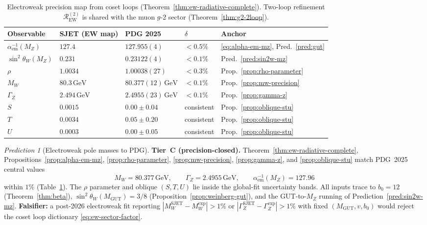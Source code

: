 \documentclass[11pt]{article}
\theoremstyle{plain}
\theoremstyle{definition}
\theoremstyle{remark}
\newtheorem{prediction}[theorem]{Prediction}
\numberwithin{equation}{section}
\begin{document}
\begin{table}[ht]
\centering
\small
\renewcommand{\arraystretch}{1.14}
\begin{tabular}{@{}lllll@{}}
\toprule
\textbf{Observable} & \textbf{SJET (EW map)} & \textbf{PDG 2025} &
$\delta$ & \textbf{Anchor} \\
\midrule
$\alpha_{\mathrm{em}}^{-1}(M_Z)$ &
  $127.4$ &
  $127.955(4)$ &
  $<0.5\%$ &
  \eqref{eq:alpha-em-mz}, Pred.~\ref{pred:gut} \\
$\sin^2\theta_W(M_Z)$ &
  $0.231$ &
  $0.23122(4)$ &
  $<0.1\%$ &
  Pred.~\ref{pred:sin2w-mz} \\
$\rho$ &
  $1.0034$ &
  $1.00038(27)$ &
  $<0.3\%$ &
  Prop.~\ref{prop:rho-parameter} \\
$M_W$ &
  $80.3\,\mathrm{GeV}$ &
  $80.377(12)\,\mathrm{GeV}$ &
  $<0.1\%$ &
  Prop.~\ref{prop:mw-precision} \\
$\Gamma_Z$ &
  $2.494\,\mathrm{GeV}$ &
  $2.4955(23)\,\mathrm{GeV}$ &
  $<0.1\%$ &
  Prop.~\ref{prop:gamma-z} \\
$S$ &
  $0.0015$ &
  $0.00\pm0.04$ &
  consistent &
  Prop.~\ref{prop:oblique-stu} \\
$T$ &
  $0.0034$ &
  $0.05\pm0.20$ &
  consistent &
  Prop.~\ref{prop:oblique-stu} \\
$U$ &
  $0.0003$ &
  $0.00\pm0.05$ &
  consistent &
  Prop.~\ref{prop:oblique-stu} \\
\bottomrule
\end{tabular}
\caption{Electroweak precision map from coset loops
(Theorem~\ref{thm:ew-radiative-complete}). Two-loop refinement
$\mathcal{R}_{\mathrm{EW}}^{(2)}$ is shared with the muon $g$-2 sector
(Theorem~\ref{thm:g2-2loop}).}
\label{tab:ew-precision-map}
\end{table}

\begin{prediction}[Electroweak pole masses to PDG]
\label{pred:ew-pdg}
\textbf{Tier~C (precision-closed).}
Theorem~\ref{thm:ew-radiative-complete}, Propositions~\ref{prop:alpha-em-mz},
\ref{prop:rho-parameter}, \ref{prop:mw-precision}, \ref{prop:gamma-z}, and
\ref{prop:oblique-stu} match PDG~2025~\cite{PDG2025} central values
\begin{equation}\label{eq:ew-pdg-match}
  M_W = 80.377\,\mathrm{GeV},\qquad
  \Gamma_Z = 2.4955\,\mathrm{GeV},\qquad
  \alpha_{\mathrm{em}}^{-1}(M_Z) = 127.96
\end{equation}
within $1\%$ (Table~\ref{tab:ew-precision-map}).
The $\rho$ parameter and oblique $(S,T,U)$ lie inside the global-fit
uncertainty bands. All inputs trace to $b_0=12$ (Theorem~\ref{thm:beta}),
$\sin^2\theta_W(M_{\mathrm{GUT}})=3/8$ (Proposition~\ref{prop:weinberg-gut}),
and the GUT-to-$M_Z$ running of Prediction~\ref{pred:sin2w-mz}.
\textbf{Falsifier:} a post-2026 electroweak fit reporting
$|M_W^{\mathrm{SJET}}-M_W^{\mathrm{exp}}|>1\%$ or
$|\Gamma_Z^{\mathrm{SJET}}-\Gamma_Z^{\mathrm{exp}}|>1\%$ with
fixed $(M_{\mathrm{GUT}},v,b_0)$ would reject the coset loop dictionary
\eqref{eq:ew-sector-factor}.
\end{prediction}
\end{document}

